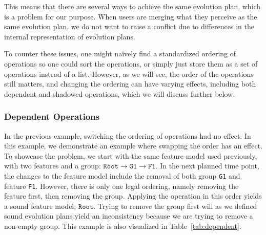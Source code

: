 \documentclass[a4paper,english]{ifimaster}
\begin{document}
This means that there are several ways to achieve the same evolution plan, which is a problem for our purpose. When users are merging what they perceive as the same evolution plan, we do not want to raise a conflict due to differences in the internal representation of evolution plans.

To counter these issues, one might naïvely find a standardized ordering of operations so one could sort the operations, or simply just store them as a set of operations instead of a list. However, as we will see, the order of the operations still matters, and changing the ordering can have varying effects, including both dependent and shadowed operations, which we will discuss further below.

\subsubsection{Dependent Operations}%
\label{ssub:dependent_operations}

In the previous example, switching the ordering of operations had no effect. In this example, we demonstrate an example where swapping the order has an effect. To showcase the problem, we start with the same feature model used previously, with two features and a group: $\texttt{Root} \rightarrow \texttt{G1} \rightarrow \texttt{F1}$. In the next planned time point, the changes to the feature model include the removal of both group \texttt{G1} and feature \texttt{F1}. However, there is only one legal ordering, namely removing the feature first, then removing the group. Applying the operation in this order yields a sound feature model; $\texttt{Root}$. Trying to remove the group first will as we defined sound evolution plans yield an inconsistency because we are trying to remove a non-empty group. This example is also visualized in Table~\ref{tab:dependent}.
\end{document}
